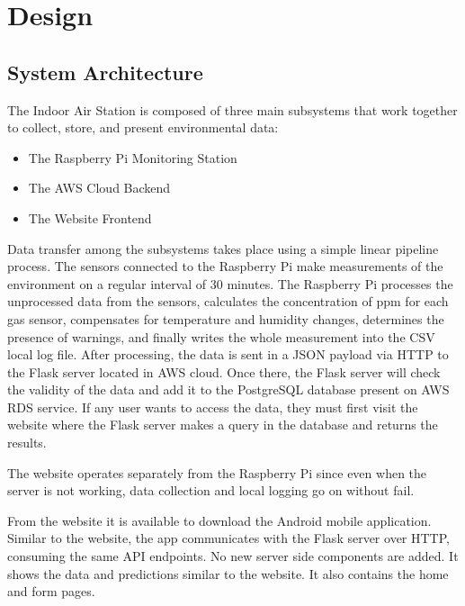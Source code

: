 
\chapter{Design}
\label{ch:design}

\section{System Architecture}
\label{sec:system-arch}

The Indoor Air Station is composed of three main subsystems that work together to collect,
store, and present environmental data:

\begin{itemize}
  \item The Raspberry Pi Monitoring Station
  \item The AWS Cloud Backend
  \item The Website Frontend
\end{itemize}

Data transfer among the subsystems takes place using a simple linear pipeline process. The
sensors connected to the Raspberry Pi make measurements of the environment on a regular
interval of 30 minutes. The Raspberry Pi processes the unprocessed data from the sensors,
calculates the concentration of ppm for each gas sensor, compensates for temperature and
humidity changes, determines the presence of warnings, and finally writes the whole
measurement into the CSV local log file. After processing, the data is sent in a JSON payload
via HTTP to the Flask server located in AWS cloud. Once there, the Flask server will check the
validity of the data and add it to the PostgreSQL database present on AWS RDS service. If any
user wants to access the data, they must first visit the website where the Flask server makes a
query in the database and returns the results.

The website operates separately from the Raspberry Pi since even when the server is not
working, data collection and local logging go on without fail.

From the website it is available to download the Android mobile application. Similar to the
website, the app communicates with the Flask server over HTTP, consuming the same API
endpoints. No new server side components are added. It shows the data and predictions similar
to the website. It also contains the home and form pages.

